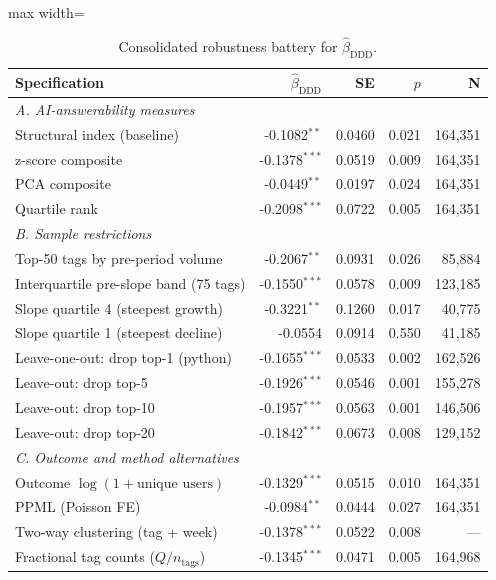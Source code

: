\begin{table}[!htbp]
\centering
\footnotesize
\setlength{\tabcolsep}{4pt}
\caption{Consolidated robustness battery for $\hat\beta_{\text{DDD}}$.}
\label{tab:rp_robustness}
\begin{adjustbox}{max width=\textwidth}
\begin{tabular}{lrrrr}
\toprule
Specification & $\hat\beta_{\text{DDD}}$ & SE & $p$ & N \\
\midrule
\multicolumn{5}{l}{\textit{A. AI-answerability measures}} \\
  Structural index (baseline) & -0.1082$^{**}$ & 0.0460 & 0.021 & 164,351 \\
  z-score composite & -0.1378$^{***}$ & 0.0519 & 0.009 & 164,351 \\
  PCA composite & -0.0449$^{**}$ & 0.0197 & 0.024 & 164,351 \\
  Quartile rank & -0.2098$^{***}$ & 0.0722 & 0.005 & 164,351 \\
\midrule
\multicolumn{5}{l}{\textit{B. Sample restrictions}} \\
  Top-50 tags by pre-period volume & -0.2067$^{**}$ & 0.0931 & 0.026 & 85,884 \\
  Interquartile pre-slope band (75 tags) & -0.1550$^{***}$ & 0.0578 & 0.009 & 123,185 \\
  Slope quartile 4 (steepest growth) & -0.3221$^{**}$ & 0.1260 & 0.017 & 40,775 \\
  Slope quartile 1 (steepest decline) & -0.0554 & 0.0914 & 0.550 & 41,185 \\
  Leave-one-out: drop top-1 (python) & -0.1655$^{***}$ & 0.0533 & 0.002 & 162,526 \\
  Leave-out: drop top-5 & -0.1926$^{***}$ & 0.0546 & 0.001 & 155,278 \\
  Leave-out: drop top-10 & -0.1957$^{***}$ & 0.0563 & 0.001 & 146,506 \\
  Leave-out: drop top-20 & -0.1842$^{***}$ & 0.0673 & 0.008 & 129,152 \\
\midrule
\multicolumn{5}{l}{\textit{C. Outcome and method alternatives}} \\
  Outcome $\log(1+\text{unique users})$ & -0.1329$^{***}$ & 0.0515 & 0.010 & 164,351 \\
  PPML (Poisson FE) & -0.0984$^{**}$ & 0.0444 & 0.027 & 164,351 \\
  Two-way clustering (tag + week) & -0.1378$^{***}$ & 0.0522 & 0.008 & --- \\
  Fractional tag counts ($Q/n_{\text{tags}}$) & -0.1345$^{***}$ & 0.0471 & 0.005 & 164,968 \\

\end{tabular}
\end{adjustbox}
\end{table}
